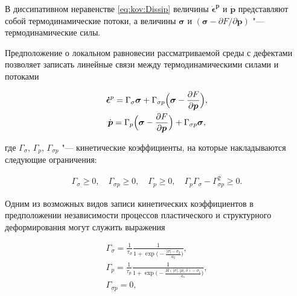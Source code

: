 В диссипативном неравенстве \eqref{eq:kov:Dissip} величины $\boldsymbol{\dot{\epsilon}^{p}}$  и $\dot{\boldsymbol{p}}$ представляют собой термодинамические потоки, а величины $\boldsymbol{\sigma}$ и $(\boldsymbol{\sigma}-{\partial F}/{\partial{\boldsymbol{p}}})$ "--- термодинамические силы.

Предположение о локальном равновесии рассматриваемой среды с дефектами позволяет записать линейные связи между термодинамическими силами и потоками

\begin{gather}

\boldsymbol{\dot{\epsilon}}^{p}=\Gamma_{\sigma}\boldsymbol{\sigma}+\Gamma_{\sigma p}\Bigl(\boldsymbol{\sigma}-\frac{\partial F}{\partial{\boldsymbol{p}}}\Bigr), \label{eq:kov:Plstrain1}\\

\dot{\boldsymbol{p}}=\Gamma_{p} \Bigl(\boldsymbol{\sigma}-\frac{\partial F}{\partial{\boldsymbol{p}}}\Bigr)+\Gamma_{\sigma p}\boldsymbol{\sigma}, \label{eq:kov:Strstrain1}

\end{gather}

где  $\Gamma_{\sigma}$, $\Gamma_{p}$, $\Gamma_{\sigma p}$ "--- кинетические коэффициенты, на которые накладываются следующие ограничения:

\begin{gather*}

\Gamma_{\sigma}\geq0,\quad

\Gamma_{\sigma p}\geq0,\quad

\Gamma_{p}\geq0,\quad

\Gamma_{p}\Gamma_{\sigma}-\Gamma^2_{\sigma p}\geq0.

\end{gather*}

Одним из возможных видов записи кинетических коэффициентов в предположении независимости процессов пластического и структурного деформирования могут служить выражения

\begin{gather}

\Gamma_{\sigma}=\frac{1}{\tau_{\sigma}}\frac{1}{1+\exp{\bigl(-\frac{ | \sigma | -\sigma_{2}}{a_{2}}\bigr)}}, \label{eq:kov:GammaS}\\

\Gamma_{p}=\frac{1}{\tau_{p}}\frac{1}{1+\exp{\bigl(-\frac{H( | \sigma | , |  p  | ,\delta)-\sigma_{1}}{a_{1}}\bigr)}}, \label{eq:kov:GammaPS}\\

\Gamma_{\sigma p}=0, \label{eq:kov:GammaPS}

\end{gather}

